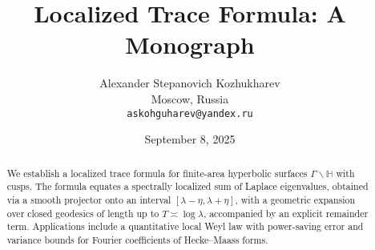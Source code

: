 \documentclass[11pt]{article}
\title{\Large\bfseries Localized Trace Formula: A Monograph}
\author{Alexander Stepanovich Kozhukharev\\
\small Moscow, Russia\\
\small \texttt{askohguharev@yandex.ru}}
\date{September 8, 2025}
\numberwithin{equation}{section}
\begin{document}
\maketitle
\thispagestyle{plain}

\begin{abstract}
We establish a localized trace formula for finite-area hyperbolic surfaces
$\Gamma \backslash \mathbb{H}$ with cusps. The formula equates a spectrally
localized sum of Laplace eigenvalues, obtained via a smooth projector onto an
interval $[\lambda-\eta,\lambda+\eta]$, with a geometric expansion over closed
geodesics of length up to $T \asymp \log \lambda$, accompanied by an explicit
remainder term. Applications include a quantitative local Weyl law with
power-saving error and variance bounds for Fourier coefficients of
Hecke--Maass forms.
\end{abstract}

\tableofcontents
















\appendix











\end{document}
